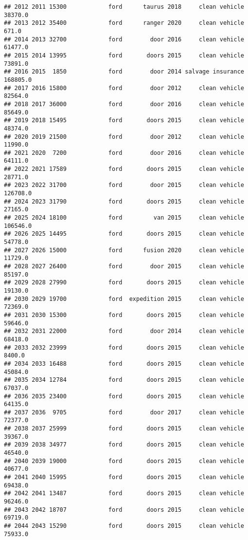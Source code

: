 \documentclass[
]{article}
\begin{document}
\begin{verbatim}
## 2012 2011 15300            ford      taurus 2018     clean vehicle   38370.0
## 2013 2012 35400            ford      ranger 2020     clean vehicle     671.0
## 2014 2013 32700            ford        door 2016     clean vehicle   61477.0
## 2015 2014 13995            ford       doors 2015     clean vehicle   73891.0
## 2016 2015  1850            ford        door 2014 salvage insurance  168805.0
## 2017 2016 15800            ford        door 2012     clean vehicle   82564.0
## 2018 2017 36000            ford        door 2016     clean vehicle   85649.0
## 2019 2018 15495            ford       doors 2015     clean vehicle   48374.0
## 2020 2019 21500            ford        door 2012     clean vehicle   11990.0
## 2021 2020  7200            ford        door 2016     clean vehicle   64111.0
## 2022 2021 17589            ford       doors 2015     clean vehicle   28771.0
## 2023 2022 31700            ford        door 2015     clean vehicle  126708.0
## 2024 2023 31790            ford       doors 2015     clean vehicle   27165.0
## 2025 2024 18100            ford         van 2015     clean vehicle  106546.0
## 2026 2025 14495            ford       doors 2015     clean vehicle   54778.0
## 2027 2026 15000            ford      fusion 2020     clean vehicle   11729.0
## 2028 2027 26400            ford        door 2015     clean vehicle   85197.0
## 2029 2028 27990            ford       doors 2015     clean vehicle   19130.0
## 2030 2029 19700            ford  expedition 2015     clean vehicle   72369.0
## 2031 2030 15300            ford       doors 2015     clean vehicle   59646.0
## 2032 2031 22000            ford        door 2014     clean vehicle   68418.0
## 2033 2032 23999            ford       doors 2015     clean vehicle    8400.0
## 2034 2033 16488            ford       doors 2015     clean vehicle   45084.0
## 2035 2034 12784            ford       doors 2015     clean vehicle   67037.0
## 2036 2035 23400            ford       doors 2015     clean vehicle   64135.0
## 2037 2036  9705            ford        door 2017     clean vehicle   72377.0
## 2038 2037 25999            ford       doors 2015     clean vehicle   39367.0
## 2039 2038 34977            ford       doors 2015     clean vehicle   46540.0
## 2040 2039 19000            ford       doors 2015     clean vehicle   40677.0
## 2041 2040 15995            ford       doors 2015     clean vehicle   69438.0
## 2042 2041 13487            ford       doors 2015     clean vehicle   96246.0
## 2043 2042 18707            ford       doors 2015     clean vehicle   69719.0
## 2044 2043 15290            ford       doors 2015     clean vehicle   75933.0

\end{verbatim}
\end{document}
